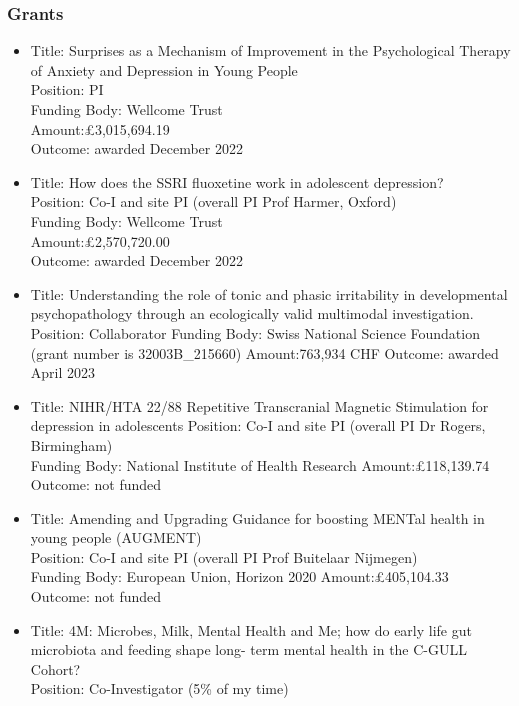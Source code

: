 \documentclass[
]{article}
\begin{document}
\hypertarget{grants}{%
\subsubsection{Grants}\label{grants}}

\begin{itemize}
\item
  Title: Surprises as a Mechanism of Improvement in the Psychological
  Therapy of Anxiety and Depression in Young People\\
  Position: PI\\
  Funding Body: Wellcome Trust\\
  Amount:£3,015,694.19\\
  Outcome: awarded December 2022
\item
  Title: How does the SSRI fluoxetine work in adolescent depression?\\
  Position: Co-I and site PI (overall PI Prof Harmer, Oxford)\\
  Funding Body: Wellcome Trust\\
  Amount:£2,570,720.00\\
  Outcome: awarded December 2022
\item
  Title: Understanding the role of tonic and phasic irritability in
  developmental psychopathology through an ecologically valid multimodal
  investigation.\\
  Position: Collaborator Funding Body: Swiss National Science Foundation
  (grant number is 32003B\_215660) Amount:763,934 CHF Outcome: awarded
  April 2023
\item
  Title: NIHR/HTA 22/88 Repetitive Transcranial Magnetic Stimulation for
  depression in adolescents Position: Co-I and site PI (overall PI Dr
  Rogers, Birmingham)\\
  Funding Body: National Institute of Health Research Amount:£118,139.74
  Outcome: not funded
\item
  Title: Amending and Upgrading Guidance for boosting MENTal health in
  young people (AUGMENT)\\
  Position: Co-I and site PI (overall PI Prof Buitelaar Nijmegen)\\
  Funding Body: European Union, Horizon 2020 Amount:£405,104.33 Outcome:
  not funded
\item
  Title: 4M: Microbes, Milk, Mental Health and Me; how do early life gut
  microbiota and feeding shape long- term mental health in the C-GULL
  Cohort?\\
  Position: Co-Investigator (5\% of my time)\\

\end{itemize}
\end{document}
